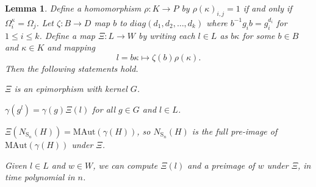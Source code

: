 \documentclass[11pt,a4paper]{article}
\newtheorem{lemma}[theorem]{Lemma}
\theoremstyle{definition}
\theoremstyle{remark}
\newcommand{\MAut}{\mathrm{MAut}}
\newcommand{\Sy}{\mathrm{S}}
\begin{document}
\begin{lemma}\label{conjActionToActionInVector}\label{mapping from $N$ to $(F_p^*)^k$} \label{notation: diag and perm}
Define a homomorphism $\rho : K \rightarrow P$ by $\rho(\kappa)_{i,j} =1$ if and only if $\Omega_i^{\kappa} = \Omega_j$. 
Let $\zeta : B \rightarrow D$ map
$b$ to $diag(d_1, d_2, \ldots, d_k)$ where $b^{-1} g_ib  = g_i^{d_i}$  for $1 \leq i \leq k$. 
Define a map $\Xi : L  \rightarrow W $ by writing each $l \in L$ as $b\kappa$ for some $b \in B$ and $\kappa \in K$ and mapping 
\[l = b\kappa  \mapsto \zeta(b) \rho(\kappa). 
\]
Then the following statements hold. 
\begin{enumerate}
    {\item \label{xi is epi with kernel $G$}$\Xi$ is an epimorphism with kernel $G$.}
   \item \label{equiv action}  $\gamma(g^{l}) = \gamma(g){\Xi(l)}$ for all $g \in G$ and $l\in L$. 
    \item \label{induces homom of norm and kernel} $\Xi(N_{\Sy_n}(H)) = \MAut(\gamma(H))$, so $N_{\Sy_n}(H)$ is the full pre-image of $ \MAut(\gamma(H))$ under $\Xi$. 
    \item \label{can compute im and preim of Xi} Given $l \in L$ and $w \in W$, we can compute $\Xi(l)$ and a preimage of $w$ under $\Xi$, in time polynomial in $n$. 
\end{enumerate}
\end{lemma}
\end{document}
